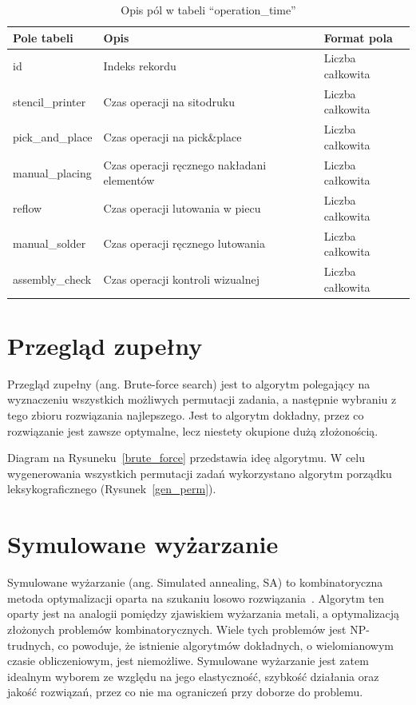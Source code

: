 \begin{table}[H]
	\centering
	\caption{Opis pól w tabeli ``operation\_time''}
	\begin{tabular}{lll}
		\toprule
		Pole tabeli      & Opis                                          & Format pola       \\
		\midrule
		id               & Indeks rekordu                                & Liczba całkowita \\
		stencil\_printer & Czas operacji na sitodruku                    & Liczba całkowita \\
		pick\_and\_place & Czas operacji na pick\&place                  & Liczba całkowita \\
		manual\_placing  & Czas operacji ręcznego nakładani elementów & Liczba całkowita \\
		reflow           & Czas operacji lutowania w piecu               & Liczba całkowita \\
		manual\_solder   & Czas operacji ręcznego lutowania             & Liczba całkowita \\
		assembly\_check  & Czas operacji kontroli wizualnej              & Liczba całkowita \\

		\bottomrule
	\end{tabular}
\end{table}

\newpage{}
\section{Przegląd zupełny}

Przegląd zupełny (ang. Brute-force search) jest to algorytm polegający na wyznaczeniu wszystkich możliwych permutacji zadania, a następnie wybraniu z tego zbioru rozwiązania najlepszego. Jest to algorytm dokładny, przez co rozwiązanie jest zawsze optymalne, lecz niestety okupione dużą złożonością.

Diagram na Rysuneku~\ref{brute_force} przedstawia ideę algorytmu. W celu wygenerowania wszystkich permutacji zadań wykorzystano algorytm porządku leksykograficznego (Rysunek~\ref{gen_perm}).

\section{Symulowane wyżarzanie}
Symulowane wyżarzanie (ang. Simulated annealing, SA) to kombinatoryczna metoda optymalizacji oparta na szukaniu losowo rozwiązania~\cite{sa}. Algorytm ten oparty jest na analogii pomiędzy zjawiskiem wyżarzania metali, a optymalizacją złożonych problemów kombinatorycznych. Wiele tych problemów jest NP-trudnych, co powoduje, że istnienie algorytmów dokładnych, o wielomianowym czasie obliczeniowym, jest niemożliwe. Symulowane wyżarzanie jest zatem idealnym wyborem ze względu na jego elastyczność, szybkość działania oraz jakość rozwiązań, przez co nie ma ograniczeń przy doborze do problemu.

